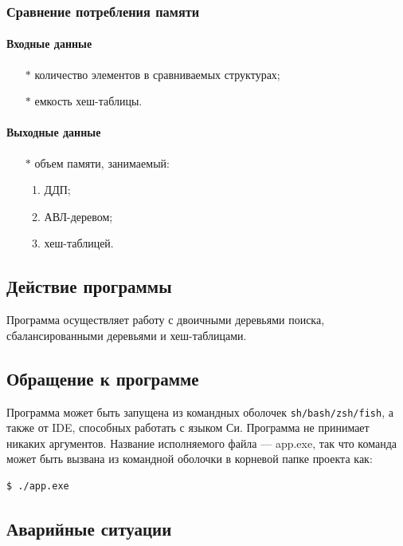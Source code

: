 \documentclass[a4paper,12pt]{extarticle}
\begin{document}
\subsubsection{Сравнение потребления памяти}

\paragraph{Входные данные}
\begin{itemize}
    \item[$*$] количество элементов в сравниваемых структурах;
    \item[$*$] емкость хеш-таблицы.
\end{itemize}

\paragraph{Выходные данные}
\begin{itemize}
    \item[$*$] объем памяти, занимаемый:
    \begin{enumerate}
    	\item ДДП;
    	\item АВЛ-деревом;
    	\item хеш-таблицей.
    \end{enumerate}
\end{itemize}

\subsection{Действие программы}
Программа осуществляет работу с двоичными деревьями поиска, сбалансированными деревьями и хеш-таблицами.

\subsection{Обращение к программе}
Программа может быть запущена из командных оболочек \texttt{sh/bash/zsh/fish}, а также от IDE, способных работать с языком Си. Программа не принимает никаких аргументов. Название исполняемого файла --- app.exe, так что команда может быть вызвана из командной оболочки в корневой папке проекта как:

\begin{verbatim}
$ ./app.exe
\end{verbatim}

\subsection{Аварийные ситуации}
\end{document}
